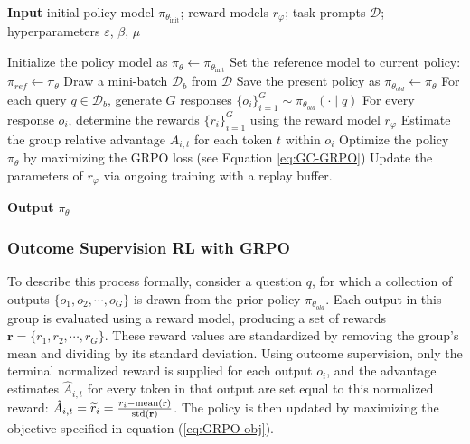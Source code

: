 \begin{itemize}[topsep=0pt]
\begin{algorithm}[t]
  \small
  \caption{Iterative Group Relative Policy Optimization}
  \textbf{Input} initial policy model $\pi_{\theta_{\text{init}}}$; reward models $r_\varphi$; task prompts $\mathcal{D}$; 
  hyperparameters $\varepsilon$, $\beta$, $\mu$
  \begin{algorithmic}[1]
    \State Initialize the policy model as $\pi_\theta \leftarrow \pi_{\theta_{\text{init}}}$
       \State Set the reference model to current policy: $\pi_{ref} \leftarrow \pi_{\theta}$
      \State Draw a mini-batch $\mathcal{D}_b$ from $\mathcal{D}$
      \State Save the present policy as $\pi_{\theta_{old}} \leftarrow \pi_{\theta}$ 
      \State For each query $q \in \mathcal{D}_b$, generate $G$ responses $\{o_i\}_{i=1}^G \sim \pi_{\theta_{old}} (\cdot \mid q)$
      \State For every response $o_i$, determine the rewards $\{r_i\}_{i=1}^{G}$ using the reward model $r_{\varphi}$ 
      \State Estimate the group relative advantage $\hat{A}_{i,t}$ for each token $t$ within $o_i$
        \State Optimize the policy $\pi_{\theta}$ by maximizing the GRPO loss (see Equation \ref{eq:GC-GRPO})
      \EndFor
    \EndFor 
    \State Update the parameters of $r_\varphi$ via ongoing training with a replay buffer. 
    \EndFor 
  \end{algorithmic}
  \textbf{Output} $\pi_\theta$
  \label{alg:iter-grpo}
\end{algorithm}

\subsubsection{Outcome Supervision RL with GRPO} To describe this process formally, consider a question $q$, for which a collection of outputs $\{o_1, o_2, \cdots, o_G\}$ is drawn from the prior policy $\pi_{\theta_{old}}$. Each output in this group is evaluated using a reward model, producing a set of rewards $\mathbf{r}=\{r_1, r_2, \cdots, r_G\}$. These reward values are standardized by removing the group's mean and dividing by its standard deviation. Using outcome supervision, only the terminal normalized reward is supplied for each output $o_i$, and the advantage estimates $\hat{A}_{i, t}$ for every token in that output are set equal to this normalized reward: $\hat{A}_{i, t} = \widetilde{r}_i = \frac{r_i- {\rm mean}(\mathbf{r})}{{\rm std}(\mathbf{r})}$. The policy is then updated by maximizing the objective specified in equation (\ref{eq:GRPO-obj}).


\end{itemize}
